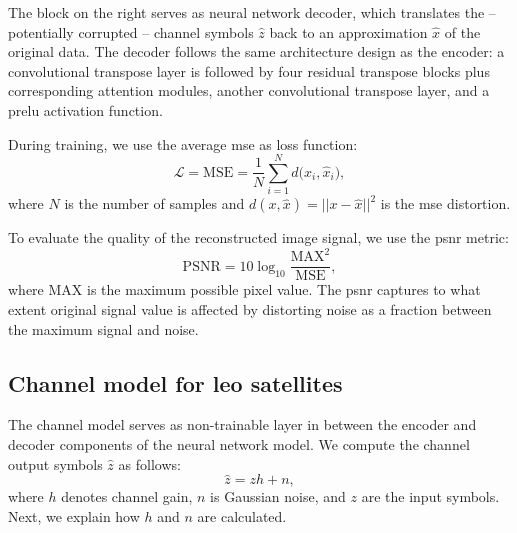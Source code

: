 \documentclass[conference]{IEEEtran}
\begin{document}
The block on the right serves as neural network decoder, which translates the -- potentially corrupted -- channel symbols $\hat{z}$ back to an approximation $\hat{x}$ of the original data.
The decoder follows the same architecture design as the encoder: a convolutional transpose layer is followed by four residual transpose blocks plus corresponding attention modules,  another convolutional transpose layer, and a \ac{prelu} activation function.

During training, we use the average \ac{mse} as loss function:
%
\begin{equation}
  \mathcal{L} = \mathrm{MSE} = \frac{1}{N} \sum_{i=1}^{N} d \bigl(x_i, \hat{x}_i\bigr),
\end{equation}
where $N$ is the number of samples and $d(x, \hat{x}) = || x - \hat{x} ||^2$ is the \ac{mse} distortion.

To evaluate the quality of the reconstructed image signal, we use the \ac{psnr} metric:
%
\begin{equation}
  \mathrm{PSNR} = 10 \log_{10}\frac{\mathrm{MAX}^2}{\mathrm{MSE}},
\end{equation}
%
where $\mathrm{MAX}$ is the maximum possible pixel value.
The \ac{psnr} captures to what extent original signal value is affected by distorting noise as a fraction between the maximum signal and noise.


\subsection{Channel model for \ac{leo} satellites}
\label{sub:channel_model}

The channel model serves as non-trainable layer in between the encoder and decoder components of the neural network model.
We compute the channel output symbols $\hat{z}$ as follows:
\begin{equation}
  \hat{z} = zh + n,
\end{equation}
where $h$ denotes channel gain, $n$ is Gaussian noise, and $z$ are the input symbols.
Next, we explain how $h$ and $n$ are calculated.
\end{document}
